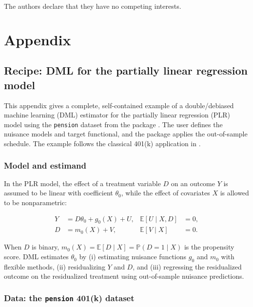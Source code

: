 The authors declare that they have no competing interests.

\section*{Appendix}\label{appendix}

\subsection{Recipe: DML for the partially linear regression model}\label{app:plr-pension}

This appendix gives a complete, self-contained example of a double/debiased machine learning (DML) estimator for the partially linear regression (PLR) model using the \texttt{pension} dataset from the  package \citep{hdm}. The user defines the nuisance models and target functional, and the package applies the out-of-sample schedule. The example follows the classical 401(k) application in \citet{chernozhukov2018}.

\subsubsection{Model and estimand}\label{model-and-estimand}

In the PLR model, the effect of a treatment variable \(D\) on an outcome \(Y\) is assumed to be linear with coefficient \(\theta_0\), while the effect of covariates \(X\) is allowed to be nonparametric:

\begin{equation}
\begin{aligned}
Y &= D \theta_0 + g_0(X) + U,
& \mathbb{E}[U \mid X,D] &= 0,\\
D &= m_0(X) + V,
& \mathbb{E}[V \mid X] &= 0.
\end{aligned}
\label{eq:plr-model}
\end{equation}

When \(D\) is binary, \(m_0(X) = \mathbb{E}\left[D \mid X\right] = \mathbb{P}\left(D=1 \mid X\right)\) is the propensity score. DML estimates \(\theta_0\) by (i) estimating nuisance functions \(g_0\) and \(m_0\) with flexible methods, (ii) residualizing \(Y\) and \(D\), and (iii) regressing the residualized outcome on the residualized treatment using out-of-sample nuisance predictions.

\subsubsection{\texorpdfstring{Data: the \texttt{pension} 401(k) dataset}{Data: the pension 401(k) dataset}}\label{data-the-pension-401k-dataset}

